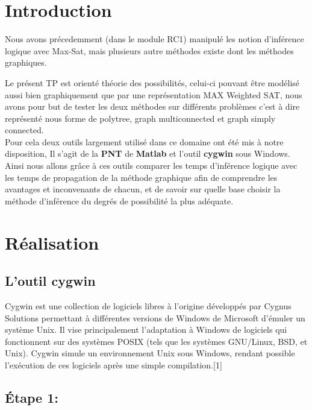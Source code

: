\documentclass[12pt,a4paper,oneside]{book}
\begin{document}
	\def\reportnumber{}
	\def\reporttitle{Inférence logique et propagation graphique }
	
	
	\tableofcontents

	\listoffigures

	
	\chapter{Introduction }
	Nous avons précedemment (dans le module RC1) manipulé les notion d'inférence logique avec Max-Sat, mais plusieurs autre méthodes existe dont les méthodes graphiques.
	
	Le présent TP est orienté théorie des possibilités, celui-ci pouvant être modélisé aussi bien graphiquement que par une représentation MAX Weighted SAT, nous avons pour but de tester les deux méthodes sur différents problèmes c'est à dire représenté nous forme de polytree, graph multiconnected et graph simply connected.\\
	
	Pour cela deux outils largement utilisé dans ce domaine ont été mis à notre disposition, Il s'agit de la \textbf{PNT} de \textbf{Matlab} et l'outil \textbf{cygwin} sous Windows.\\

Ainsi nous allons grâce à ces outils comparer les temps d'inférence logique avec les temps de propagation de la méthode graphique afin de comprendre les avantages et inconvenants de chacun, et de savoir sur quelle base choisir la méthode d'inférence du degrés de possibilité la plus adéquate.
	
	
	\chapter{Réalisation}
	\section{L'outil cygwin}
	Cygwin est une collection de logiciels libres à l'origine développés par Cygnus Solutions permettant à différentes versions de Windows de Microsoft d'émuler un système Unix. Il vise principalement l'adaptation à Windows de logiciels qui fonctionnent sur des systèmes POSIX (tels que les systèmes GNU/Linux, BSD, et Unix). Cygwin simule un environnement Unix sous Windows, rendant possible l'exécution de ces logiciels après une simple compilation.[1] 
	
	\section{Étape 1:}
\end{document}
